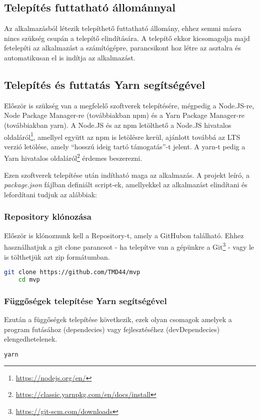 \subsection{Telepítés futtatható állománnyal}
Az alkalmazásból létezik telepíthető futtatható állomány, ehhez semmi másra nincs szükség csupán a telepítő elindítására. A telepítő ekkor kicsomagolja majd fetelepíti az alkalmazást a számítógépre, parancsikont hoz létre az asztalra és automatikusan el is indítja az alkalmazást.

\subsection{Telepítés és futtatás Yarn segítségével}
Először is szükség van a megfelelő szoftverek telepítésére, mégpedig a Node.JS-re, Node Package Manager-re (továbbiakban npm) és a Yarn Package Manager-re (továbbiakban yarn). A Node.JS és az npm letölthető a Node.JS hivatalos oldaláról\footnote{\url{https://nodejs.org/en/}}, amellyel együtt az npm is letölésre kerül, ajánlott továbbá az LTS verzió letölése, amely ``hosszú ideig tartó támogatás''-t jelent. A yarn-t pedig a Yarn hivatalos oldaláról\footnote{\url{https://classic.yarnpkg.com/en/docs/install}} érdemes beszerezni.

Ezen szoftverek telepítése után indítható maga az alkalmazás. A projekt leíró, a {\it package.json} fájlban definiált script-ek, amellyekkel az alkalmazást elindítani és lefordítani tudjuk az alábbiak:

\subsubsection{Repository klónozása}
Először is klónoznunk kell a Repository-t, amely a GitHubon található. Ehhez használhatjuk a git clone parancsot - ha telepítve van a gépünkre a Git\footnote{\url{https://git-scm.com/downloads}} - vagy le is tölthetjük azt zip formátumban.
\begin{lstlisting}[language={Bash}, numbers={none}]
    git clone https://github.com/TMD44/mvp
    cd mvp
\end{lstlisting}

\subsubsection{Függőségek telepítése Yarn segítségével}
Ezután a függőségek telepítése következik, ezek olyan csomagok amelyek a program futásához (dependecies) vagy fejlesztéséhez (devDependecies) elengedhetelenek.
\begin{lstlisting}[language={Bash}, numbers={none}]
    yarn
\end{lstlisting}

